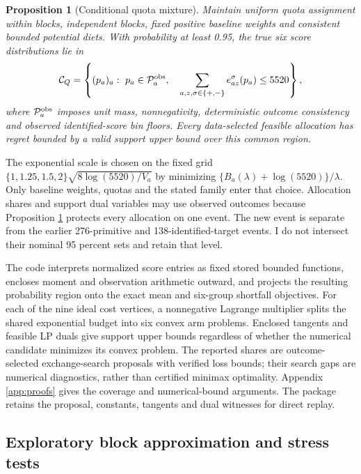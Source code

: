 \documentclass[11pt]{article}
\newtheorem{proposition}{Proposition}
\begin{document}
\begin{proposition}[Conditional quota mixture]\label{prop:quota}
Maintain uniform quota assignment within blocks, independent blocks, fixed positive baseline weights and consistent bounded potential diets. With probability at least 0.95, the true six score distributions lie in
\[
 \mathcal C_Q=\left\{(p_a)_a:\ p_a\in\mathcal P_a^{\rm obs},\quad
 \sum_{a,z,\sigma\in\{+,-\}}e_{az}^{\sigma}(p_a)\leq5520\right\},
\]
where $\mathcal P_a^{\rm obs}$ imposes unit mass, nonnegativity, deterministic outcome consistency and observed identified-score bin floors. Every data-selected feasible allocation has regret bounded by a valid support upper bound over this common region.
\end{proposition}

The exponential scale is chosen on the fixed grid $\{1,1.25,1.5,2\}\sqrt{8\log(5520)/V_a}$ by minimizing $\{B_a(\lambda)+\log(5520)\}/\lambda$. Only baseline weights, quotas and the stated family enter that choice. Allocation shares and support dual variables may use observed outcomes because Proposition \ref{prop:quota} protects every allocation on one event. The new event is separate from the earlier 276-primitive and 138-identified-target events. I do not intersect their nominal 95 percent sets and retain that level.

The code interprets normalized score entries as fixed stored bounded functions, encloses moment and observation arithmetic outward, and projects the resulting probability region onto the exact mean and six-group shortfall objectives. For each of the nine ideal cost vertices, a nonnegative Lagrange multiplier splits the shared exponential budget into six convex arm problems. Enclosed tangents and feasible LP duals give support upper bounds regardless of whether the numerical candidate minimizes its convex problem. The reported shares are outcome-selected exchange-search proposals with verified loss bounds; their search gaps are numerical diagnostics, rather than certified minimax optimality. Appendix \ref{app:proofs} gives the coverage and numerical-bound arguments. The package retains the proposal, constants, tangents and dual witnesses for direct replay.

\subsection{Exploratory block approximation and stress tests}
\end{document}
